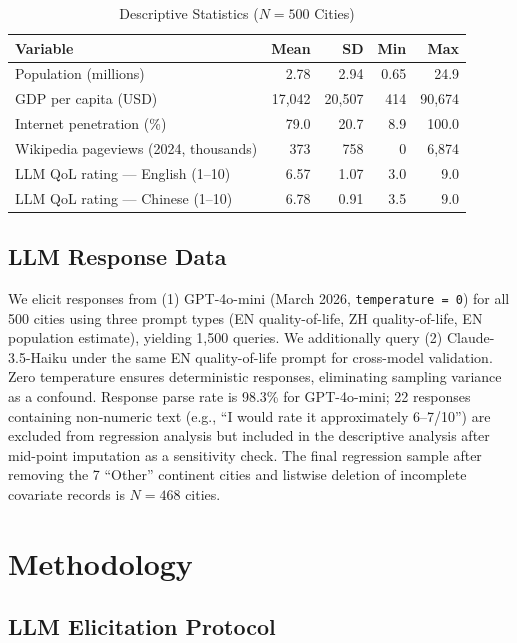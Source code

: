 \documentclass[12pt]{article}
\begin{document}
\begin{table}[htbp]
\caption{Descriptive Statistics ($N = 500$ Cities)}
\label{tab:descriptive}
\centering
\begin{tabular}{lrrrr}
\toprule
Variable & Mean & SD & Min & Max \\
\midrule
Population (millions) & 2.78 & 2.94 & 0.65 & 24.9 \\
GDP per capita (USD) & 17,042 & 20,507 & 414 & 90,674 \\
Internet penetration (\%) & 79.0 & 20.7 & 8.9 & 100.0 \\
Wikipedia pageviews (2024, thousands) & 373 & 758 & 0 & 6,874 \\
LLM QoL rating --- English (1--10) & 6.57 & 1.07 & 3.0 & 9.0 \\
LLM QoL rating --- Chinese (1--10) & 6.78 & 0.91 & 3.5 & 9.0 \\
\bottomrule
\end{tabular}
\end{table}

\subsection{LLM Response Data}

We elicit responses from (1) GPT-4o-mini (March 2026, \texttt{temperature = 0}) for all 500 cities using three prompt types (EN quality-of-life, ZH quality-of-life, EN population estimate), yielding 1,500 queries. We additionally query (2) Claude-3.5-Haiku under the same EN quality-of-life prompt for cross-model validation. Zero temperature ensures deterministic responses, eliminating sampling variance as a confound. Response parse rate is 98.3\% for GPT-4o-mini; 22 responses containing non-numeric text (e.g., ``I would rate it approximately 6--7/10'') are excluded from regression analysis but included in the descriptive analysis after mid-point imputation as a sensitivity check. The final regression sample after removing the 7 ``Other'' continent cities and listwise deletion of incomplete covariate records is $N = 468$ cities.

\section{Methodology}
\label{sec:method}

\subsection{LLM Elicitation Protocol}
\end{document}
